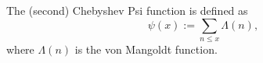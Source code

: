 \begin{definition}[ChebyshevPsi]
\label{ChebyshevPsi}
\leanok
The (second) Chebyshev Psi function is defined as
  $$
  \psi(x) := \sum_{n \le x} \Lambda(n),
  $$
  where $\Lambda(n)$ is the von Mangoldt function.
\end{definition}
